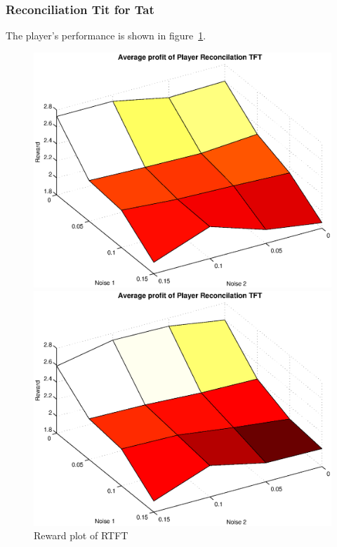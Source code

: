 \subsubsection{Reconciliation Tit for Tat}
The player's performance is shown in figure~\ref{pic player rtft}.\\
\begin{figure}[h]
	\caption{Reward plot of RTFT}
	\label{pic player rtft}
\begin{minipage}[hbt]{0.65\textwidth}
	\centering
	\includegraphics[width=\textwidth]{pics/simulation1/Reward_vs_Noise_of_Player_Reconcilation_TFT}
\end{minipage}
\hfill
\begin{minipage}[hbt]{0.3\textwidth}
	\centering
	\includegraphics[width=\textwidth]{pics/simulation2/Reward_vs_Noise_of_Player_Reconcilation_TFT}
\end{minipage}

\end{figure}

